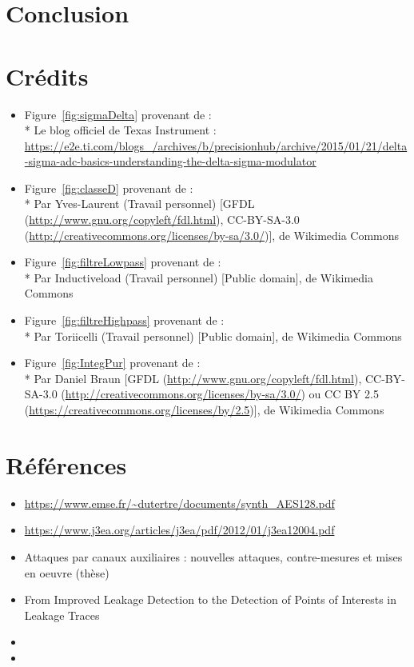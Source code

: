 \documentclass[10pt, oneside, a4paper]{article}
\begin{document}
\newpage
\section{Conclusion}


\newpage
\pagebreak
{}
\section*{Crédits}

\begin{itemize}
\item Figure~\ref{fig:sigmaDelta} provenant de :\\*
Le blog officiel de Texas Instrument :
\url{https://e2e.ti.com/blogs_/archives/b/precisionhub/archive/2015/01/21/delta-sigma-adc-basics-understanding-the-delta-sigma-modulator}

\item Figure~\ref{fig:classeD} provenant de :\\*
Par Yves-Laurent (Travail personnel) [GFDL (\url{http://www.gnu.org/copyleft/fdl.html}),
CC-BY-SA-3.0 (\url{http://creativecommons.org/licenses/by-sa/3.0/})], de Wikimedia Commons

\item Figure~\ref{fig:filtreLowpass} provenant de :\\*
Par Inductiveload (Travail personnel) [Public domain], de Wikimedia Commons

\item Figure~\ref{fig:filtreHighpass} provenant de :\\*
Par Toriicelli (Travail personnel) [Public domain], de Wikimedia Commons

\item Figure~\ref{fig:IntegPur} provenant de :\\*
Par Daniel Braun [GFDL (\url{http://www.gnu.org/copyleft/fdl.html}),
CC-BY-SA-3.0 (\url{http://creativecommons.org/licenses/by-sa/3.0/}) ou
CC BY 2.5 (\url{https://creativecommons.org/licenses/by/2.5})], de Wikimedia Commons
\end{itemize}

\section*{Références}

\begin{itemize}
\item \url{https://www.emse.fr/~dutertre/documents/synth_AES128.pdf}
\item \url{https://www.j3ea.org/articles/j3ea/pdf/2012/01/j3ea12004.pdf}
\item Attaques par canaux auxiliaires : nouvelles attaques, contre-mesures et mises en oeuvre (thèse)
\item From Improved Leakage Detection to the Detection of Points of Interests in Leakage Traces
\item 
\item 
\end{itemize}
\end{document}
